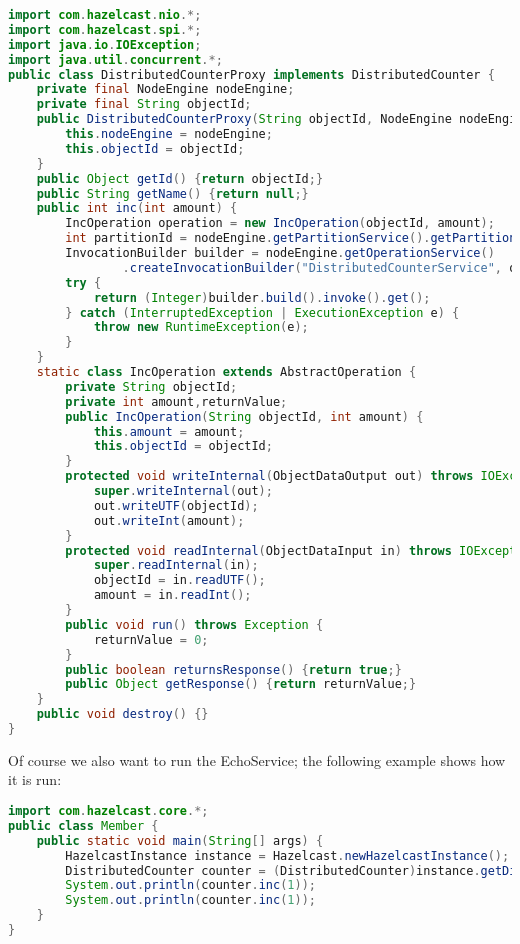 \begin{lstlisting}[language=java]
import com.hazelcast.nio.*;
import com.hazelcast.spi.*;
import java.io.IOException;
import java.util.concurrent.*;
public class DistributedCounterProxy implements DistributedCounter {
    private final NodeEngine nodeEngine;
    private final String objectId;
    public DistributedCounterProxy(String objectId, NodeEngine nodeEngine) {
        this.nodeEngine = nodeEngine;
        this.objectId = objectId;
    }
    public Object getId() {return objectId;}
    public String getName() {return null;}
    public int inc(int amount) {
        IncOperation operation = new IncOperation(objectId, amount);
        int partitionId = nodeEngine.getPartitionService().getPartitionId(objectId);
        InvocationBuilder builder = nodeEngine.getOperationService()
                .createInvocationBuilder("DistributedCounterService", operation, partitionId);
        try {
            return (Integer)builder.build().invoke().get();
        } catch (InterruptedException | ExecutionException e) {
            throw new RuntimeException(e);
        }
    }
    static class IncOperation extends AbstractOperation {
        private String objectId;
        private int amount,returnValue;
        public IncOperation(String objectId, int amount) {
            this.amount = amount;
            this.objectId = objectId;
        }
        protected void writeInternal(ObjectDataOutput out) throws IOException {
            super.writeInternal(out);
            out.writeUTF(objectId);
            out.writeInt(amount);
        }
        protected void readInternal(ObjectDataInput in) throws IOException {
            super.readInternal(in);
            objectId = in.readUTF();
            amount = in.readInt();
        }
        public void run() throws Exception {
            returnValue = 0;
        }
        public boolean returnsResponse() {return true;}
        public Object getResponse() {return returnValue;}
    }
    public void destroy() {}
}
\end{lstlisting}

Of course we also want to run the EchoService; the following example shows how it is run:
\begin{lstlisting}[language=java]
import com.hazelcast.core.*;
public class Member {
    public static void main(String[] args) {
        HazelcastInstance instance = Hazelcast.newHazelcastInstance();
        DistributedCounter counter = (DistributedCounter)instance.getDistributedObject("DistributedCounterService","counter1");
        System.out.println(counter.inc(1));
        System.out.println(counter.inc(1));
    }
}
\end{lstlisting}

